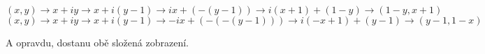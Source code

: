 \documentclass[12pt]{article}					%
\begin{document}
\begin{priklad}
\begin{prikladin}[b)*]
\begin{reseni}
                $$ (x, y) \rightarrow x + iy \rightarrow x + i(y-1) \rightarrow ix + (-(y-1)) \rightarrow i(x+1) + (1-y) \rightarrow (1-y, x+1) $$
                $$ (x, y) \rightarrow x + iy \rightarrow x + i(y-1) \rightarrow -ix + (-(-(y-1))) \rightarrow i(-x+1) + (y-1) \rightarrow (y-1, 1-x) $$

                A opravdu, dostanu obě složená zobrazení.
            \end{reseni}
        \end{prikladin}

    \end{priklad}
\end{document}
